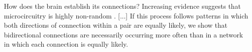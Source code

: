 
How does the brain establish its connections? Increasing evidence suggests that microcircuitry is highly non-random \cite{Song2005,Perin2011}. [...] If this process follows patterns in which both directions of connection within a pair are equally likely, we show that bidirectional connections are necessarily occurring more often than in a network in which each connection is equally likely.

